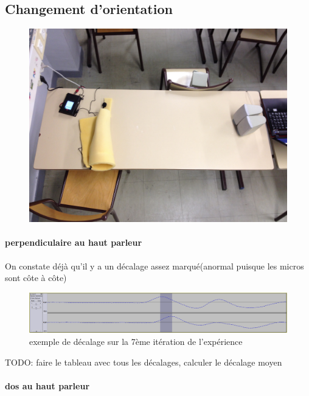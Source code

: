 \documentclass[12pt,a4paper]{article}
\begin{document}
\subsection{Changement d'orientation}


\begin{figure}[H]
\includegraphics[width=\textwidth]{../donnees25-02/IMG_0923.jpg} 
\end{figure}


\paragraph{perpendiculaire au haut parleur}

On constate déjà qu'il y a un décalage assez marqué(anormal puisque les micros sont côte à côte)
\begin{figure}[h]
\includegraphics[width=\textwidth]{../donnees25-02/mesures_perpendiculaires/test7.png} 
\caption{exemple de décalage sur la 7ème itération de l'expérience}
\end{figure}

TODO: faire le tableau avec tous les décalages, calculer le décalage moyen

\paragraph{dos au haut parleur}
\end{document}
